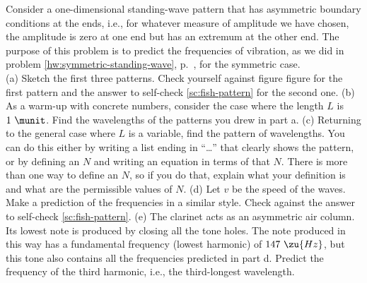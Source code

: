 Consider a one-dimensional standing-wave pattern that has asymmetric boundary
conditions at the ends, i.e., for whatever measure of amplitude we have chosen,
the amplitude is zero at one end but has an extremum at the other end.
The purpose of this problem is to predict the frequencies of vibration, as
we did in problem \ref{hw:symmetric-standing-wave}, p.~\pageref{hw:symmetric-standing-wave},
for the symmetric case.\\
(a) Sketch the first three patterns. Check yourself against figure
figure  for the first pattern and
the answer to self-check \ref{sc:fish-pattern} for the second one.\hwendpart
(b) As a warm-up with concrete numbers, consider the case where the length $L$ is $1\ \munit$.
Find the wavelengths of the patterns you drew in part a.\hwendpart
(c) Returning to the general case where $L$ is a variable, find the pattern of wavelengths.
You can do this either by writing a list ending in ``\ldots'' that clearly shows the pattern,
or by defining an $N$ and writing an equation in terms of that $N$. There is more than one
way to define an $N$, so if you do that, explain what your definition is and what are the
permissible values of $N$.\hwendpart
(d) Let $v$ be the speed of the waves. Make a prediction of the frequencies in a similar style. Check
against the answer to self-check \ref{sc:fish-pattern}.\hwendpart
(e) The clarinet acts as an asymmetric air column.
Its lowest note is produced by closing all the tone holes. The note produced
in this way has a fundamental frequency (lowest harmonic) of $147\ \zu{Hz}$, but this tone also contains
all the frequencies predicted in part d. Predict the frequency
of the third harmonic, i.e., the third-longest wavelength.\answercheck\hwendpart
